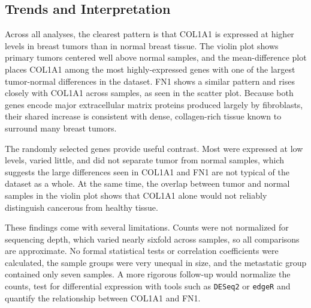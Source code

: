 \documentclass{article}
\begin{document}
\subsection{Trends and Interpretation}
Across all analyses, the clearest pattern is that COL1A1 is expressed at higher levels in breast tumors than in normal breast tissue. The violin plot shows primary tumors centered well above normal samples, and the mean-difference plot places COL1A1 among the most highly-expressed genes with one of the largest tumor-normal differences in the dataset. FN1 shows a similar pattern and rises closely with COL1A1 across samples, as seen in the scatter plot. Because both genes encode major extracellular matrix proteins produced largely by fibroblasts, their shared increase is consistent with dense, collagen-rich tissue known to surround many breast tumors.

The randomly selected genes provide useful contrast. Most were expressed at low levels, varied little, and did not separate tumor from normal samples, which suggests the large differences seen in COL1A1 and FN1 are not typical of the dataset as a whole. At the same time, the overlap between tumor and normal samples in the violin plot shows that COL1A1 alone would not reliably distinguish cancerous from healthy tissue.

These findings come with several limitations. Counts were not normalized for sequencing depth, which varied nearly sixfold across samples, so all comparisons are approximate. No formal statistical tests or correlation coefficients were calculated, the sample groups were very unequal in size, and the metastatic group contained only seven samples. A more rigorous follow-up would normalize the counts, test for differential expression with tools such as \texttt{DESeq2} or \texttt{edgeR} and quantify the relationship between COL1A1 and FN1.




\end{document}
